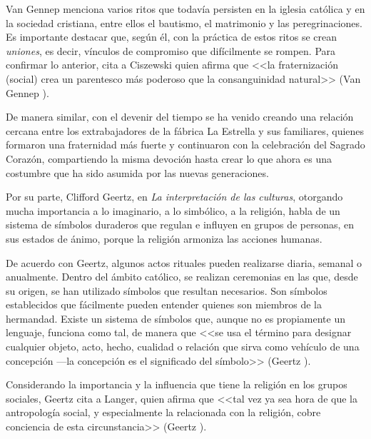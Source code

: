 \documentclass[14pt,letterpaper,twoside]{extbook} %
\begin{document}
\noindent Van Gennep menciona varios ritos que todavía persisten en la iglesia católica y en la sociedad cristiana, entre ellos el bautismo, el matrimonio y las peregrinaciones. Es importante destacar que, según él, con la práctica de estos ritos se crean \textit{uniones}, es decir, vínculos de compromiso que difícilmente se rompen. Para confirmar lo anterior, cita a Ciszewski quien afirma que <<la fraternización (social) crea un parentesco más poderoso que la consanguinidad natural>> (Van Gennep ).

De manera similar, con el devenir del tiempo se ha venido creando una relación cercana entre los extrabajadores de la fábrica La Estrella y sus familiares, quienes formaron una fraternidad más fuerte y continuaron con la celebración del Sagrado Corazón, compartiendo la misma devoción hasta crear lo que ahora es una costumbre que ha sido asumida por las nuevas generaciones.

Por su parte, Clifford Geertz, en \textit{La interpretación de las culturas}, otorgando mucha importancia a lo imaginario, a lo simbólico, a la religión, habla de un sistema de símbolos duraderos que regulan e influyen en grupos de personas, en sus estados de ánimo, porque la religión armoniza las acciones humanas.

De acuerdo con Geertz, algunos actos rituales pueden realizarse diaria, semanal o anualmente. Dentro del ámbito católico, se realizan ceremonias en las que, desde su origen, se han utilizado símbolos que resultan necesarios. Son símbolos establecidos que fácilmente pueden entender quienes son miembros de la hermandad. Existe un sistema de símbolos que, aunque no es propiamente un lenguaje, funciona como tal, de manera que <<se usa el término para designar cualquier objeto, acto, hecho, cualidad o relación que sirva como vehículo de una concepción ---la concepción es el significado del símbolo>> (Geertz ).

Considerando la importancia y la influencia que tiene la religión en los grupos sociales, Geertz cita a Langer, quien afirma que <<tal vez ya sea hora de que la antropología social, y especialmente la relacionada con la religión, cobre conciencia de esta circunstancia>> (Geertz
).
\end{document}
